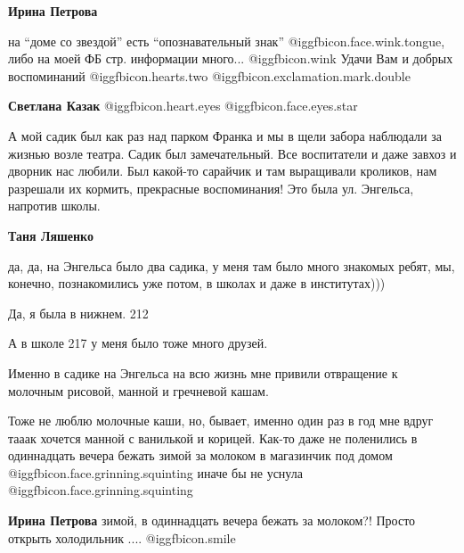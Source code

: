 \begin{itemize}
\begin{itemize}
\begin{itemize} %
\textbf{Ирина Петрова} 

на \enquote{доме со звездой} есть \enquote{опознавательный знак} @igg{fbicon.face.wink.tongue}, либо на моей ФБ
стр. информации много... @igg{fbicon.wink}  Удачи Вам и добрых воспоминаний @igg{fbicon.hearts.two}  @igg{fbicon.exclamation.mark.double}

\end{itemize} %

\textbf{Светлана Казак} @igg{fbicon.heart.eyes}  @igg{fbicon.face.eyes.star} 

\end{itemize} %


А мой садик был как раз над парком Франка и мы в щели забора наблюдали за
жизнью возле театра. Садик был замечательный. Все воспитатели и даже завхоз и
дворник нас любили. Был какой-то сарайчик и там выращивали кроликов, нам
разрешали их кормить, прекрасные воспоминания! Это была ул. Энгельса, напротив
школы.

\begin{itemize} %
\textbf{Таня Ляшенко} 

да, да, на Энгельса было два садика, у меня там было много знакомых ребят, мы,
конечно, познакомились уже потом, в школах и даже в институтах)))

Да, я была в нижнем. 212

А в школе 217 у меня было тоже много друзей.


Именно в садике на Энгельса на всю жизнь мне привили отвращение к молочным
рисовой, манной и гречневой кашам.


Тоже не люблю молочные каши, но, бывает, именно один раз в год мне вдруг тааак
хочется манной с ванилькой и корицей. Как-то даже не поленились в одиннадцать
вечера бежать зимой за молоком в магазинчик под домом @igg{fbicon.face.grinning.squinting}  иначе бы не уснула @igg{fbicon.face.grinning.squinting} 

\begin{itemize} %
\textbf{Ирина Петрова} зимой, в одиннадцать вечера бежать за молоком?! Просто открыть холодильник ....  @igg{fbicon.smile} 
\end{itemize} %


\end{itemize}
\end{itemize}
